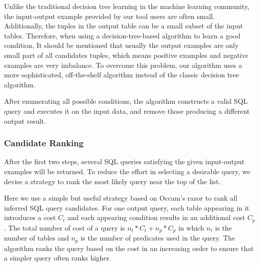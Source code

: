 Unlike the traditional decision tree learning in the machine learning community,
the input-output example provided by our tool users are often small. Additionally,
the tuples in the output table can be a small subset of the input tables.
Therefore, when using a decision-tree-based algorithm to learn a good condition,
It should be mentioned that usually the output examples are only small part of all candidates tuples, which means positive examples and negative examples are very imbalance. 
To overcome this problem, our algorithm uses a more sophisticated, off-the-shelf algorithm\cite{Chris:2003} instead of the classic decision tree algorithm.

 

After enumerating all possible conditions, the algorithm constructs a valid SQL query and executes it on the input data, and remove those producing a different output result.


\subsubsection{Candidate Ranking}
\label{sec:ranking}

After the first two steps, several SQL queries satisfying the given input-output examples
will be returned. To reduce the effort in selecting a desirable query, we devise a strategy
to rank the most likely query near the top of the list.

Here we use a simple but useful strategy based on Occam's razor to rank all inferred SQL query candidates.
For one output query, each table appearing in it introduces a cost $C_t$ and each appearing condition 
results in an additional cost $C_p$. The total number of cost of a query is $n_t*C_t+n_p*C_p$ in which
$n_t$ is the number of tables and $n_p$ is the number of predicates used in the query. The algorithm
ranks the query based on the cost in an increasing order to ensure that a simpler query often ranks higher.



